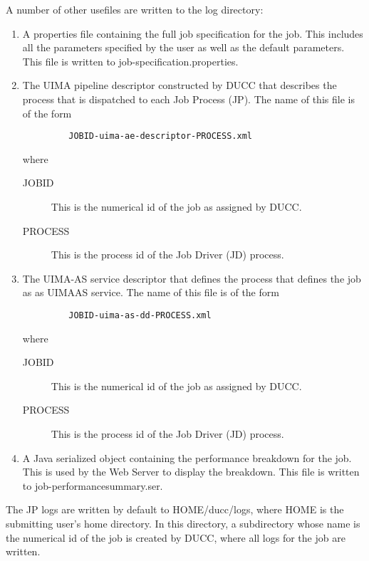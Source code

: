A number of other usefiles are written to the log directory: 
\begin{enumerate}

  \item A properties file containing the full job specification for the job. This includes all the 
    parameters specified by the user as well as the default parameters. This file is written to 
    job-specification.properties. 


  \item The UIMA pipeline descriptor constructed by DUCC that describes the process that is 
    dispatched to each Job Process (JP). The name of this file is of the form 

\begin{verbatim}
         JOBID-uima-ae-descriptor-PROCESS.xml 
\end{verbatim}

    where 

    \begin{description}
        \item[JOBID] This is the numerical id of the job as assigned by DUCC.
        \item[PROCESS] This is the process id of the Job Driver (JD) process.
        \end{description}
      
      \item The UIMA-AS service descriptor that defines the process that defines the job as as UIMAAS 
        service. The name of this file is of the form 
\begin{verbatim}
         JOBID-uima-as-dd-PROCESS.xml 
\end{verbatim}
    
        where 
        \begin{description}
            \item[JOBID] This is the numerical id of the job as assigned by DUCC.
            \item[PROCESS] This is the process id of the Job Driver (JD) process.
        \end{description}

      \item A Java serialized object containing the performance breakdown for the job. This is used 
        by the Web Server to display the breakdown. This file is written to job-performancesummary.ser. 
 \end{enumerate}

 The JP logs are written by default to HOME/ducc/logs, where HOME is the submitting user's 
 home directory. In this directory, a subdirectory whose name is the numerical id of the job is 
 created by DUCC, where all logs for the job are written. 
 
